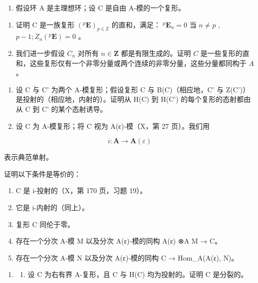 
\begin{enumerate}
\def\labelenumi{\arabic{enumi})}
\tightlist
\item
  假设环 A 是主理想环；设 C 是自由 A-模的一个复形。
\end{enumerate}

\begin{enumerate}
\def\labelenumi{\alph{enumi})}
\item
  证明 C 是一族复形 \((^{p}\mathbf{E})_{p\in \mathbb{Z}}\) 的直和，满足： \(^{p}\mathbf{E}_{n} = 0\) 当 \(n\neq p\) , \(p - 1 ; Z_{n}(^{p}\mathbf{E}) = 0\) 。
\item
  我们进一步假设 \(C_n\) 对所有 \(n \in \mathbf{Z}\) 都是有限生成的。证明 \(C\) 是一些复形的直和，这些复形仅有一个非零分量或两个连续的非零分量，这些分量都同构于 \(A\) 。
\end{enumerate}

\begin{enumerate}
\def\labelenumi{\arabic{enumi})}
\setcounter{enumi}{1}
\item
  设 C 与 C' 为两个 A-模复形；假设复形 C 与 B(C)（相应地，C' 与 Z(C')）是投射的（相应地，内射的）。证明从 H(C) 到 H(C') 的每个复形的态射都由从 C 到 C' 的某个态射诱导。
\item
  设 C 为 A-模复形；将 C 视为 A(ε)-模（X，第 27 页）。我们用
\end{enumerate}

\[
i: \mathbf {A} \rightarrow \mathbf {A} (\varepsilon)
\]

表示典范单射。

证明以下条件是等价的：

\begin{enumerate}
\def\labelenumi{(\roman{enumi})}
\item
  C 是 i-投射的（X，第 170 页，习题 19）。
\item
  它是 i-内射的（同上）。
\item
  复形 C 同伦于零。
\item
  存在一个分次 A-模 M 以及分次 A(ε)-模的同构 A(ε) ⊗A M → C。
\item
  存在一个分次 A-模 N 以及分次 A(ε)-模的同构 C → Hom\_A(A(ε), N)。
\end{enumerate}

\begin{enumerate}
\def\labelenumi{\arabic{enumi})}
\setcounter{enumi}{3}
\tightlist
\item
  \begin{enumerate}
  \def\labelenumii{\alph{enumii})}
  \tightlist
  \item
    设 C 为右有界 A-复形，且 C 与 H(C) 均为投射的。证明 C 是分裂的。
  \end{enumerate}
\end{enumerate}

